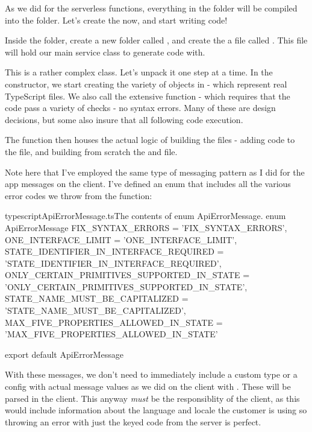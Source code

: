 \documentclass[paper=6in:9in,pagesize=pdftex,headinclude=on,footinclude=on,12pt,twoside]{scrbook}
\begin{document}
As we did for the serverless functions, everything in the  folder will be compiled into the  folder. Let's create the  now, and start writing code!


Inside the  folder, create a new folder called , and create the a file called . This file will hold our main service class to generate code with.


This is a rather complex class. Let's unpack it one step at a time. In the constructor, we start creating the variety of  objects in  - which represent real TypeScript files. We also call the extensive  function - which requires that the code pass a variety of checks - no syntax errors. Many of these are design decisions, but some also insure that all following code execution.

The  function then houses the actual logic of building the files - adding code to the  file, and building from scratch the  and  file.

Note here that I've employed the same type of messaging pattern as I did for the app messages on the client. I've defined an  enum that includes all the various error codes we throw from the  function:

\begin{codeInput}{typescript}{ApiErrorMessage.ts}{The contents of enum ApiErrorMessage.}
  enum ApiErrorMessage {
    FIX_SYNTAX_ERRORS = 'FIX_SYNTAX_ERRORS',
    ONE_INTERFACE_LIMIT = 'ONE_INTERFACE_LIMIT',
    STATE_IDENTIFIER_IN_INTERFACE_REQUIRED = 'STATE_IDENTIFIER_IN_INTERFACE_REQUIRED',
    ONLY_CERTAIN_PRIMITIVES_SUPPORTED_IN_STATE = 'ONLY_CERTAIN_PRIMITIVES_SUPPORTED_IN_STATE',
    STATE_NAME_MUST_BE_CAPITALIZED = 'STATE_NAME_MUST_BE_CAPITALIZED',
    MAX_FIVE_PROPERTIES_ALLOWED_IN_STATE = 'MAX_FIVE_PROPERTIES_ALLOWED_IN_STATE'
}

export default ApiErrorMessage
\end{codeInput}

With these messages, we don't need to immediately include a custom type or a config with actual message values as we did on the client with . These  will be parsed in the client. This anyway \textit{must} be the responsiblity of the client, as this would include information about the language and locale the customer is using so throwing an error with just the keyed code from the server is perfect.
\end{document}
